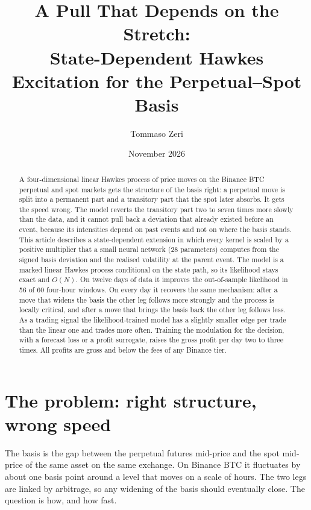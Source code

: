 \documentclass[a4paper,11pt]{article}
\title{A Pull That Depends on the Stretch:\\ State-Dependent Hawkes Excitation for the Perpetual--Spot Basis}
\author{Tommaso Zeri}
\date{November 2026}
\begin{document}
\maketitle

\begin{abstract}
\noindent A four-dimensional linear Hawkes process of price moves on the Binance BTC perpetual and spot markets gets the structure of the basis right: a perpetual move is split into a permanent part and a transitory part that the spot later absorbs. It gets the speed wrong. The model reverts the transitory part two to seven times more slowly than the data, and it cannot pull back a deviation that already existed before an event, because its intensities depend on past events and not on where the basis stands. This article describes a state-dependent extension in which every kernel is scaled by a positive multiplier that a small neural network (28 parameters) computes from the signed basis deviation and the realised volatility at the parent event. The model is a marked linear Hawkes process conditional on the state path, so its likelihood stays exact and $O(N)$. On twelve days of data it improves the out-of-sample likelihood in 56 of 60 four-hour windows. On every day it recovers the same mechanism: after a move that widens the basis the other leg follows more strongly and the process is locally critical, and after a move that brings the basis back the other leg follows less. As a trading signal the likelihood-trained model has a slightly smaller edge per trade than the linear one and trades more often. Training the modulation for the decision, with a forecast loss or a profit surrogate, raises the gross profit per day two to three times. All profits are gross and below the fees of any Binance tier.
\end{abstract}

\section{The problem: right structure, wrong speed}

The basis is the gap between the perpetual futures mid-price and the spot mid-price of the same asset on the same exchange. On Binance BTC it fluctuates by about one basis point around a level that moves on a scale of hours. The two legs are linked by arbitrage, so any widening of the basis should eventually close. The question is how, and how fast.
\end{document}
